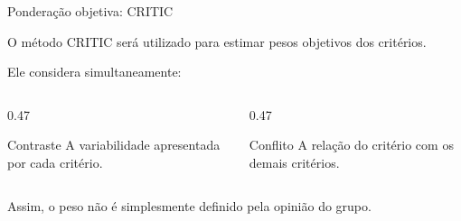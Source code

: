 
\begin{frame}{Ponderação objetiva: CRITIC}

    O método CRITIC será utilizado para estimar pesos objetivos dos
    critérios.

    \vspace{0.3cm}

    Ele considera simultaneamente:

    \begin{columns}[T]

        \begin{column}{0.47\textwidth}

            \begin{block}{Contraste}
                A variabilidade apresentada por cada critério.
            \end{block}

        \end{column}


        \begin{column}{0.47\textwidth}

            \begin{block}{Conflito}
                A relação do critério com os demais critérios.
            \end{block}

        \end{column}

    \end{columns}

    \vspace{0.4cm}

    Assim, o peso não é simplesmente definido pela opinião do grupo.

\end{frame}




